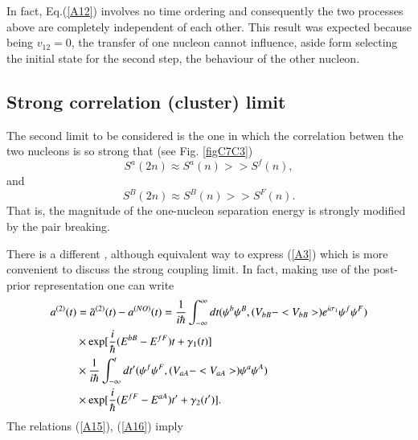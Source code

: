 \begin{subappendices}
In fact, Eq.(\ref{A12}) involves no time ordering and consequently the two processes above are completely independent of each other. 
This result was expected because being $v_{12}= 0$, the transfer of one nucleon cannot influence, aside form selecting the
initial state for the second step, the behaviour of the other nucleon.

\subsection{Strong correlation (cluster) limit}

The second limit to be considered is the one in which the correlation betwen the two nucleons is so strong that (see Fig. \ref{figC7C3})
\begin{equation}
S^a(2n) \approx S^a(n) >> S^f(n),
\label{A15}
\end{equation}
and 
\begin{equation}
S^B(2n) \approx S^B(n) >> S^F(n).
\label{A16}
\end{equation}
That is, the magnitude of the one-nucleon separation energy is strongly modified by the pair breaking.

There is a different , although equivalent way to express (\ref{A3}) which is  more convenient to discuss the strong coupling limit.
In fact, making use of the post-prior representation one can write
\begin{eqnarray}
a^{(2)}(t) &= \tilde a^{(2)}(t) - a^{(NO)}(t) = 
\frac{1}{i \hbar} \int^{\infty}_{-\infty} dt (\psi^b \psi^B, (V_{bB} - <V_{bB}>) e^{i \sigma_1} \psi^f \psi^F ) \nonumber \\ 
&\times {\rm exp} [\frac{i}{\hbar} (E^{bB} - E^{fF}) t + \gamma_1(t)]  \nonumber  \\
&\nonumber\times\frac{1}{i \hbar} \int^{t}_{-\infty} dt' (\psi^f \psi^F, (V_{aA} - <V_{aA}>) \psi^a \psi^A )\\
& \times 
{\rm exp} [\frac{i}{\hbar} (E^{fF} - E^{aA}) t' + \gamma_2(t')].
\end{eqnarray}
The relations  (\ref{A15}), (\ref{A16}) imply 


\end{subappendices}
